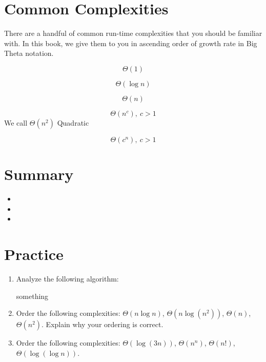 \documentclass[main.tex]{subfiles}
\begin{document}
\begin{example}
	
\end{example}

\section{Common Complexities}

There are a handful of common run-time complexities that you should be familiar with. In this book, we give them to you in ascending order of growth rate in Big Theta notation.

\begin{defn}[Constant]
	\[\Theta(1)\]
\end{defn}

\begin{defn}[Logarithmic]
	\[\Theta(\log n)\]
\end{defn}

\begin{defn}[Linear]
	\[\Theta(n)\]
\end{defn}

\begin{defn}[Polynomial]
	\[\Theta(n^c),\ c > 1\]
	We call \(\Theta(n^2)\) Quadratic
\end{defn}

\begin{defn}[Exponential]
	\[\Theta(c^n),\ c > 1\]
\end{defn}

\section{Summary}

\begin{itemize}
	\item 
	\item 
	\item 
\end{itemize}

\section{Practice}

\begin{enumerate}
	\item Analyze the following algorithm:
	\begin{algorithmic}[1]
			\State something
		\EndFunction
	\end{algorithmic}
	\item Order the following complexities: \(\Theta(n \log n)\), \(\Theta(n \log (n^2))\), \(\Theta(n)\), \(\Theta(n^2)\). Explain why your ordering is correct.
	\item Order the following complexities: \(\Theta(\log (3n))\), \(\Theta(n^n)\), \(\Theta(n!)\), \(\Theta(\log (\log n))\).
\end{enumerate}
\end{document}
